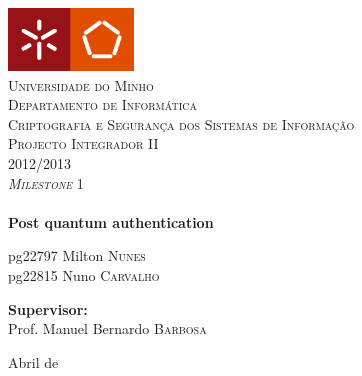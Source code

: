\begin{titlepage}

\begin{center}

\includegraphics[width=0.25\textwidth]{img/um-eng}\\[1cm]

\textsc{\LARGE Universidade do Minho\\Departamento de Informática}\\[1cm]

\textsc{\Large Criptografia e Segurança dos Sistemas de Informação}\\[0.5cm]
\textsc{\Large Projecto Integrador II\\2012/2013}\\[0.25cm]
\textsc{\textit{Milestone} 1}\\[0.5cm]


\HRule \\[0.4cm]
{ \huge \bfseries Post quantum authentication}
\HRule \\[1.5cm]
%
\begin{minipage}[t]{0.4\textwidth}
\begin{flushleft} \large
pg22797 Milton \textsc{Nunes}\\
pg22815 Nuno \textsc{Carvalho}\\
\end{flushleft}
\end{minipage}
\begin{minipage}[t]{0.4\textwidth}
\begin{flushright} \large
\textbf{Supervisor:}\\
Prof. Manuel Bernardo \textsc{Barbosa}
\end{flushright}
\end{minipage}

\vfill


{\large Abril de \the\year}


\end{center}
\end{titlepage}
